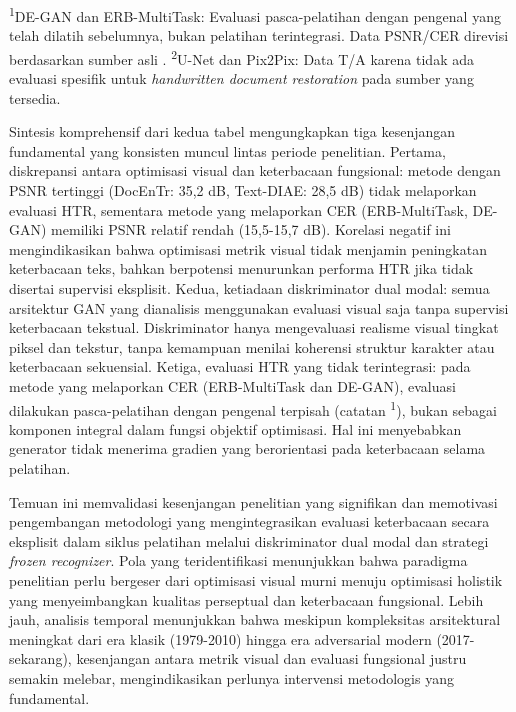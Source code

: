 \begin{table}[htbp]
      \vspace{1ex}
      {\footnotesize\textsuperscript{1}DE-GAN dan ERB-MultiTask: Evaluasi pasca-pelatihan dengan pengenal yang telah dilatih sebelumnya, bukan pelatihan terintegrasi. Data PSNR/CER direvisi berdasarkan sumber asli \parencite{souibgui2021erb,souibgui2022docentr}.
      \textsuperscript{2}U-Net dan Pix2Pix: Data T/A karena tidak ada evaluasi spesifik untuk \textit{handwritten document restoration} pada sumber yang tersedia.}
\end{table}

Sintesis komprehensif dari kedua tabel mengungkapkan tiga kesenjangan fundamental yang konsisten muncul lintas periode penelitian. Pertama, diskrepansi antara optimisasi visual dan keterbacaan fungsional: metode dengan PSNR tertinggi (DocEnTr: 35,2 dB, Text-DIAE: 28,5 dB) tidak melaporkan evaluasi HTR, sementara metode yang melaporkan CER (ERB-MultiTask, DE-GAN) memiliki PSNR relatif rendah (15,5-15,7 dB). Korelasi negatif ini mengindikasikan bahwa optimisasi metrik visual tidak menjamin peningkatan keterbacaan teks, bahkan berpotensi menurunkan performa HTR jika tidak disertai supervisi eksplisit. Kedua, ketiadaan diskriminator dual modal: semua arsitektur GAN yang dianalisis menggunakan evaluasi visual saja tanpa supervisi keterbacaan tekstual. Diskriminator hanya mengevaluasi realisme visual tingkat piksel dan tekstur, tanpa kemampuan menilai koherensi struktur karakter atau keterbacaan sekuensial. Ketiga, evaluasi HTR yang tidak terintegrasi: pada metode yang melaporkan CER (ERB-MultiTask dan DE-GAN), evaluasi dilakukan pasca-pelatihan dengan pengenal terpisah (catatan \textsuperscript{1}), bukan sebagai komponen integral dalam fungsi objektif optimisasi. Hal ini menyebabkan generator tidak menerima gradien yang berorientasi pada keterbacaan selama pelatihan.

Temuan ini memvalidasi kesenjangan penelitian yang signifikan dan memotivasi pengembangan metodologi yang mengintegrasikan evaluasi keterbacaan secara eksplisit dalam siklus pelatihan melalui diskriminator dual modal dan strategi \textit{frozen recognizer}. Pola yang teridentifikasi menunjukkan bahwa paradigma penelitian perlu bergeser dari optimisasi visual murni menuju optimisasi holistik yang menyeimbangkan kualitas perseptual dan keterbacaan fungsional. Lebih jauh, analisis temporal menunjukkan bahwa meskipun kompleksitas arsitektural meningkat dari era klasik (1979-2010) hingga era adversarial modern (2017-sekarang), kesenjangan antara metrik visual dan evaluasi fungsional justru semakin melebar, mengindikasikan perlunya intervensi metodologis yang fundamental.

